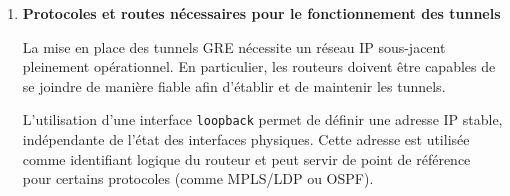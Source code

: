 \documentclass[12pt,a4paper, oneside]{memoir}
\begin{document}
\begin{enumerate}

\item {\textbf{Protocoles et routes nécessaires pour le fonctionnement des tunnels}}

La mise en place des tunnels GRE nécessite un réseau IP sous-jacent pleinement opérationnel. 
En particulier, les routeurs doivent être capables de se joindre de manière fiable afin d’établir et de maintenir les tunnels.

L’utilisation d’une interface \texttt{loopback} permet de définir une adresse IP stable, indépendante de l’état des interfaces physiques. Cette adresse est utilisée comme identifiant logique du routeur et peut servir de point de référence pour certains protocoles 
(comme MPLS/LDP ou OSPF).


\end{enumerate}
\end{document}
